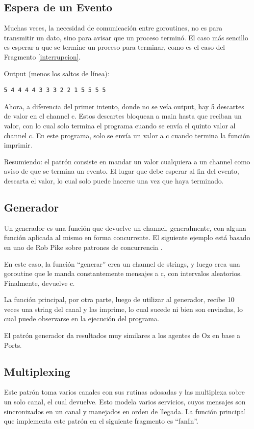 \documentclass{article}
\begin{document}
\subsection{Espera de un Evento}
Muchas veces, la necesidad de comunicación entre goroutines, no es para transmitir un dato, sino para avisar que un proceso terminó. El caso más sencillo es esperar a que se termine un proceso para terminar, como es el caso del Fragmento \ref{interrupcion}.


Output (menos los saltos de línea):
\begin{verbatim}
5 4 4 4 4 3 3 3 2 2 1 5 5 5 5 
\end{verbatim}

Ahora, a diferencia del primer intento, donde no se veía output, hay 5 descartes de valor en el channel c. Estos descartes bloquean a main hasta que reciban un valor, con lo cual solo termina el programa cuando se envía el quinto valor al channel c. En este programa, solo se envía un valor a c cuando termina la función imprimir.

Resumiendo: el patrón consiste en mandar un valor cualquiera a un channel como aviso de que se termina un evento. El lugar que debe esperar al fin del evento, descarta el valor, lo cual solo puede hacerse una vez que haya terminado.

\subsection{Generador}
Un generador es una función que devuelve un channel, generalmente, con alguna función aplicada al mismo en forma concurrente. El siguiente ejemplo está basado en uno de Rob Pike sobre patrones de concurrencia \cite{video}.



En este caso, la función ``generar'' crea un channel de strings, y luego crea una goroutine que le manda constantemente mensajes a c, con intervalos aleatorios. Finalmente, devuelve c.

La función principal, por otra parte, luego de utilizar al generador, recibe 10 veces una string del canal y las imprime, lo cual sucede ni bien son enviadas, lo cual puede observarse en la ejecución del programa.

El patrón generador da resultados muy similares a los agentes de Oz en base a Ports.

\subsection{Multiplexing}
Este patrón toma varios canales con sus rutinas adosadas y las multiplexa sobre un solo canal, el cual devuelve. Esto modela varios servicios, cuyos mensajes son sincronizados en un canal y manejados en orden de llegada. La función principal que implementa este patrón en el siguiente fragmento es ``fanIn''.

\end{document}
